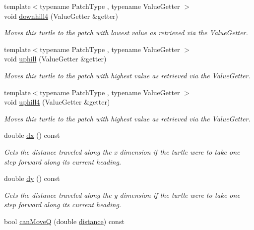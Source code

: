 \begin{DoxyCompactItemize}
{\footnotesize template$<$typename Patch\-Type , typename Value\-Getter $>$ }\\void \hyperlink{classrepast_1_1relogo_1_1_turtle_aebaff67686279b81c0e3618c07f43034}{downhill4} (Value\-Getter \&getter)
\begin{DoxyCompactList}\small\item\em Moves this turtle to the patch with lowest value as retrieved via the Value\-Getter. \end{DoxyCompactList}\item 
{\footnotesize template$<$typename Patch\-Type , typename Value\-Getter $>$ }\\void \hyperlink{classrepast_1_1relogo_1_1_turtle_a9aaaed905670dfb1cfb4fd30fbf252ec}{uphill} (Value\-Getter \&getter)
\begin{DoxyCompactList}\small\item\em Moves this turtle to the patch with highest value as retrieved via the Value\-Getter. \end{DoxyCompactList}\item 
{\footnotesize template$<$typename Patch\-Type , typename Value\-Getter $>$ }\\void \hyperlink{classrepast_1_1relogo_1_1_turtle_a7b840c9cdc55d9627aaf3bbdcecaa786}{uphill4} (Value\-Getter \&getter)
\begin{DoxyCompactList}\small\item\em Moves this turtle to the patch with highest value as retrieved via the Value\-Getter. \end{DoxyCompactList}\item 
double \hyperlink{classrepast_1_1relogo_1_1_turtle_a22a5a715b813f7d0ca4f148200a22666}{dx} () const 
\begin{DoxyCompactList}\small\item\em Gets the distance traveled along the x dimension if the turtle were to take one step forward along its current heading. \end{DoxyCompactList}\item 
double \hyperlink{classrepast_1_1relogo_1_1_turtle_a933a5e1fef04d7cc2e98d6bf36897012}{dy} () const 
\begin{DoxyCompactList}\small\item\em Gets the distance traveled along the y dimension if the turtle were to take one step forward along its current heading. \end{DoxyCompactList}\item 
bool \hyperlink{classrepast_1_1relogo_1_1_turtle_a032e7e51b676c480519ba1abfbd9df17}{can\-Move\-Q} (double \hyperlink{classrepast_1_1relogo_1_1_turtle_af1f309528154fa89567e4c4e7b6660b6}{distance}) const 

\end{DoxyCompactItemize}
